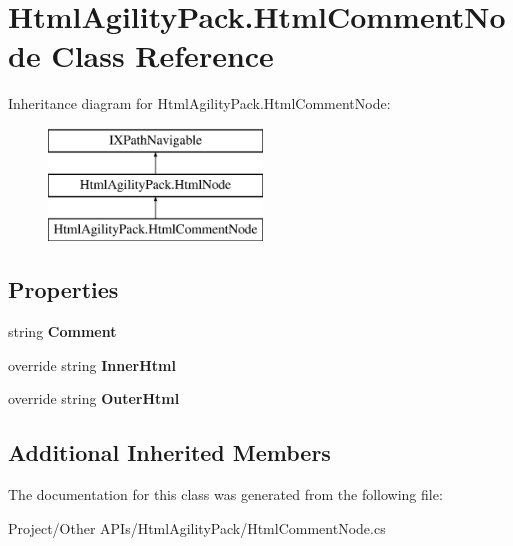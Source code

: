 \hypertarget{class_html_agility_pack_1_1_html_comment_node}{}\section{Html\+Agility\+Pack.\+Html\+Comment\+Node Class Reference}
\label{class_html_agility_pack_1_1_html_comment_node}
Inheritance diagram for Html\+Agility\+Pack.\+Html\+Comment\+Node\+:\begin{figure}[H]
\begin{center}
\leavevmode
\includegraphics[height=3.000000cm]{class_html_agility_pack_1_1_html_comment_node}
\end{center}
\end{figure}
\subsection*{Properties}
\begin{DoxyCompactItemize}
\item 
\mbox{\label{class_html_agility_pack_1_1_html_comment_node_a072305daa4168e586f070629c595e859}} 
string {\bfseries Comment}
\item 
\mbox{\label{class_html_agility_pack_1_1_html_comment_node_adc94c29551cbbdfcccd7b93603a653a4}} 
override string {\bfseries Inner\+Html}
\item 
\mbox{\label{class_html_agility_pack_1_1_html_comment_node_ae1208290299bbe32fc4e4a75ca37654c}} 
override string {\bfseries Outer\+Html}
\end{DoxyCompactItemize}
\subsection*{Additional Inherited Members}


The documentation for this class was generated from the following file\+:\begin{DoxyCompactItemize}
\item 
Project/\+Other A\+P\+Is/\+Html\+Agility\+Pack/Html\+Comment\+Node.\+cs\end{DoxyCompactItemize}

